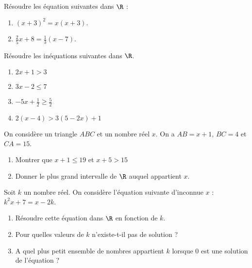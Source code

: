 \begin{minipage}{0.48\linewidth}


Résoudre les équation suivantes dans $\R$ : 

\begin{enumerate}
\item $(x+3)^2=x(x+3)$.
\item $\frac{2}{5}x+8=\frac{1}{3}(x-7)$.
\end{enumerate}
\end{minipage}
\hfill
\begin{minipage}{0.48\linewidth}


Résoudre les inéquations suivantes dans $\R$.

\begin{enumerate}
\item $2x+1>3$
\item $3x-2 \leq 7$
\item $-5x + \frac{1}{2} \geq \frac{5}{2}$
\item $2(x-4) > 3(5-2x)+1$
\end{enumerate}


\end{minipage}



On considère un triangle $ABC$ et un nombre réel $x$. On a $AB=x+1$, $BC=4$ et $CA=15$.

\begin{enumerate}
\item Montrer que $x+1 \leq 19$ et $ x+5 > 15$
\item Donner le plus grand intervalle de $\R$ auquel appartient $x$.
\end{enumerate}



Soit $k$ un nombre réel. On considère l'équation suivante d'inconnue $x$ : $k^2x+7=x-2k$.

\begin{enumerate}
\item Résoudre cette équation dans $\R$ en fonction de $k$.
\item Pour quelles valeurs de $k$ n'existe-t-il pas de solution ?
\item A quel plus petit ensemble de nombres appartient $k$ lorsque 0 est une solution de l'équation ?
\end{enumerate}


